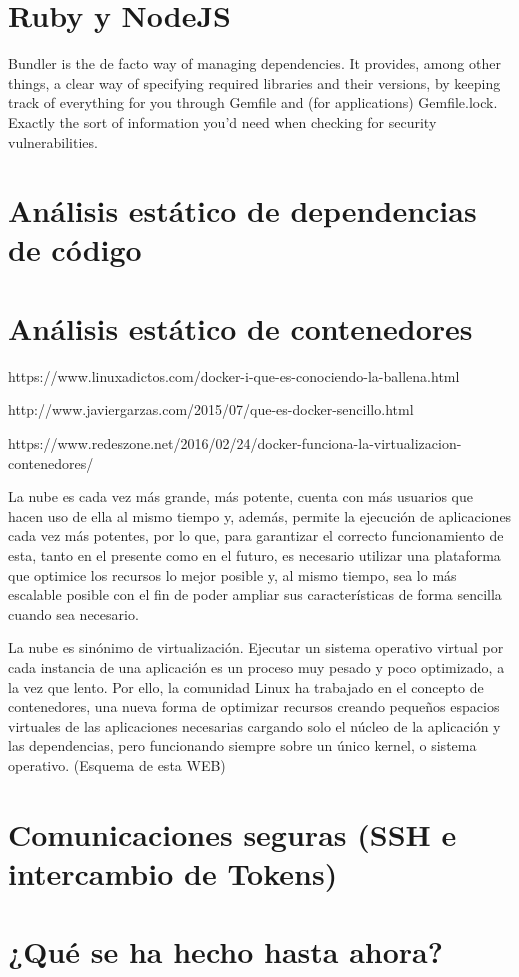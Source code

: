 \section{Ruby y NodeJS}


Bundler is the de facto way of managing dependencies. It provides, among other things, a clear way of specifying required libraries and their versions, by keeping track of everything for you through Gemfile and (for applications) Gemfile.lock. Exactly the sort of information you’d need when checking for security vulnerabilities.

\section{Análisis estático de dependencias de código}


\section{Análisis estático de contenedores}


https://www.linuxadictos.com/docker-i-que-es-conociendo-la-ballena.html

http://www.javiergarzas.com/2015/07/que-es-docker-sencillo.html

https://www.redeszone.net/2016/02/24/docker-funciona-la-virtualizacion-contenedores/


La nube es cada vez más grande, más potente, cuenta con más usuarios que hacen uso de ella al mismo tiempo y, además, permite la ejecución de aplicaciones cada vez más potentes, por lo que, para garantizar el correcto funcionamiento de esta, tanto en el presente como en el futuro, es necesario utilizar una plataforma que optimice los recursos lo mejor posible y, al mismo tiempo, sea lo más escalable posible con el fin de poder ampliar sus características de forma sencilla cuando sea necesario.

La nube es sinónimo de virtualización. Ejecutar un sistema operativo virtual por cada instancia de una aplicación es un proceso muy pesado y poco optimizado, a la vez que lento. Por ello, la comunidad Linux ha trabajado en el concepto de contenedores, una nueva forma de optimizar recursos creando pequeños espacios virtuales de las aplicaciones necesarias cargando solo el núcleo de la aplicación y las dependencias, pero funcionando siempre sobre un único kernel, o sistema operativo. (Esquema de esta WEB)



\section{Comunicaciones seguras (SSH e intercambio de Tokens)}

\section{¿Qué se ha hecho hasta ahora?}

\endinput